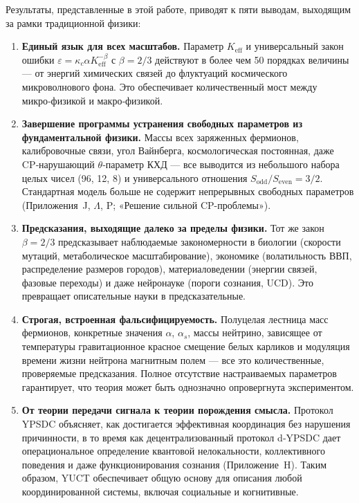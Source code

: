 \documentclass[11pt,a4paper]{article}
\begin{document}
	Результаты, представленные в этой работе, приводят к пяти выводам, выходящим за рамки
	традиционной физики:
	
	\begin{enumerate}
		\item \textbf{Единый язык для всех масштабов.}
		Параметр \(K_{\mathrm{eff}}\) и универсальный закон ошибки
		\(\varepsilon = \kappa_c \alpha K_{\mathrm{eff}}^{-\beta}\) с \(\beta = 2/3\) действуют в
		более чем 50 порядках величины — от энергий химических связей до флуктуаций
		космического микроволнового фона. Это обеспечивает количественный мост между микро‑физикой и
		макро‑физикой.
		
		\item \textbf{Завершение программы устранения свободных параметров из фундаментальной
			физики.}
		Массы всех заряженных фермионов, калибровочные связи, угол Вайнберга,
		космологическая постоянная, даже CP‑нарушающий \(\theta\)‑параметр КХД — все
		выводится из небольшого набора целых чисел (96, 12, 8) и универсального отношения
		\(S_{\mathrm{odd}}/S_{\mathrm{even}} = 3/2\). Стандартная модель больше не содержит
		непрерывных свободных параметров (Приложения~J, \(\Lambda\), P; «Решение сильной CP-проблемы»).
		
		\item \textbf{Предсказания, выходящие далеко за пределы физики.}
		Тот же закон \(\beta = 2/3\) предсказывает наблюдаемые закономерности в биологии (скорости мутаций,
		метаболическое масштабирование), экономике (волатильность ВВП, распределение размеров городов), материаловедении
		(энергии связей, фазовые переходы) и даже нейронауке (пороги сознания,
		UCD). Это превращает описательные науки в предсказательные.
		
		\item \textbf{Строгая, встроенная фальсифицируемость.}
		Полуцелая лестница масс фермионов, конкретные значения \(\alpha\), \(\alpha_s\),
		массы нейтрино, зависящее от температуры гравитационное красное смещение белых карликов и
		модуляция времени жизни нейтрона магнитным полем — все это количественные, проверяемые
		предсказания. Полное отсутствие настраиваемых параметров гарантирует, что теория может
		быть однозначно опровергнута экспериментом.
		
		\item \textbf{От теории передачи сигнала к теории порождения смысла.}
		Протокол YPSDC объясняет, как достигается эффективная координация без нарушения
		причинности, в то время как децентрализованный протокол d‑YPSDC дает операциональное определение
		квантовой нелокальности, коллективного поведения и даже функционирования сознания
		(Приложение~H). Таким образом, YUCT обеспечивает общую основу для описания любой координированной
		системы, включая социальные и когнитивные.
	\end{enumerate}
	
\end{document}
